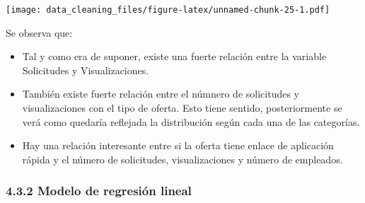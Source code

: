 \documentclass[
]{article}
\newenvironment{Shaded}{\begin{snugshade}}{\end{snugshade}}
\newcommand{\CommentTok}[1]{\textcolor[rgb]{0.50,0.62,0.50}{#1}}
\newcommand{\DataTypeTok}[1]{\textcolor[rgb]{0.87,0.87,0.75}{#1}}
\newcommand{\DecValTok}[1]{\textcolor[rgb]{0.86,0.86,0.80}{#1}}
\newcommand{\KeywordTok}[1]{\textcolor[rgb]{0.94,0.87,0.69}{#1}}
\newcommand{\NormalTok}[1]{\textcolor[rgb]{0.80,0.80,0.80}{#1}}
\newcommand{\OperatorTok}[1]{\textcolor[rgb]{0.94,0.94,0.82}{#1}}
\newcommand{\StringTok}[1]{\textcolor[rgb]{0.80,0.58,0.58}{#1}}
\providecommand{\tightlist}{%
  \setlength{\itemsep}{0pt}\setlength{\parskip}{0pt}}
\begin{document}
\begin{Shaded}
\end{Shaded}

\texttt{[image: data\_cleaning\_files/figure-latex/unnamed-chunk-25-1.pdf]}

Se observa que:

\begin{itemize}
\tightlist
\item
  Tal y como era de suponer, existe una fuerte relación entre la
  variable Solicitudes y Visualizaciones.
\item
  También existe fuerte relación entre el númnero de solicitudes y
  visualizaciones con el tipo de oferta. Esto tiene sentido,
  posteriormente se verá como quedaría reflejada la distribución según
  cada una de las categorías.
\item
  Hay una relación interesante entre si la oferta tiene enlace de
  aplicación rápida y el número de solicitudes, visualizaciones y número
  de empleados.
\end{itemize}

\hypertarget{modelo-de-regresiuxf3n-lineal}{%
\subsubsection{4.3.2 Modelo de regresión
lineal}\label{modelo-de-regresiuxf3n-lineal}}
\end{document}
